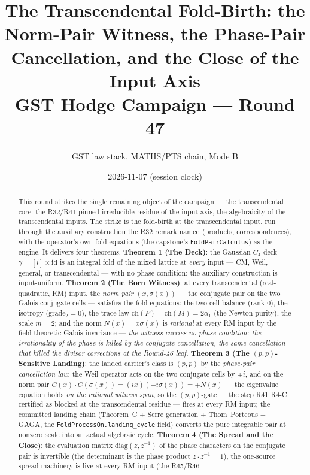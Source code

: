 \documentclass[11pt]{article}
\title{The Transcendental Fold-Birth: the Norm-Pair Witness, the Phase-Pair Cancellation, and the Close of the Input Axis\\[6pt]
\large GST Hodge Campaign --- Round 47}
\author{GST law stack, MATHS/PTS chain, Mode B}
\date{2026-11-07 (session clock)}
\theoremstyle{definition}
\begin{document}
\maketitle

\begin{abstract}
This round strikes the single remaining object of the campaign --- the
transcendental core: the R32/R41-pinned irreducible residue of the input
axis, the algebraicity of the transcendental inputs. The strike is the
fold-birth at the transcendental input, run through the auxiliary
construction the R32 remark named (products, correspondences), with the
operator's own fold equations (the capstone's
\texttt{FoldPairCalculus}) as the engine. It delivers four theorems.
\textbf{Theorem 1 (The Deck)}: the Gaussian $C_4$-deck
$\gamma=[i]\times\mathrm{id}$ is an integral fold of the mixed lattice at
\emph{every} input --- CM, Weil, general, or transcendental --- with no
phase condition: the auxiliary construction is input-uniform.
\textbf{Theorem 2 (The Born Witness)}: at every transcendental
(real-quadratic, RM) input, the \emph{norm pair} $(x,\sigma(x))$ --- the
conjugate pair on the two Galois-conjugate cells --- satisfies the fold
equations: the two-cell balance (rank $0$), the isotropy (grade$_2=0$),
the trace law $\mathrm{ch}(P)-\mathrm{ch}(M)=2\alpha_1$ (the Newton
purity), the scale $m=2$; and the norm $N(x)=x\sigma(x)$ is
\emph{rational} at every RM input by the field-theoretic Galois
invariance --- \emph{the witness carries no phase condition: the
irrationality of the phase is killed by the conjugate cancellation, the
same cancellation that killed the divisor corrections at the Round-46
leaf.} \textbf{Theorem 3 (The $(p,p)$-Sensitive Landing)}: the landed
carrier's class is $(p,p)$ by the \emph{phase-pair cancellation law}: the
Weil operator acts on the two conjugate cells by $\pm i$, and on the norm
pair $C(x)\cdot C(\sigma(x)) = (ix)(-i\sigma(x)) = +N(x)$ --- the
eigenvalue equation holds \emph{on the rational witness span}, so the
$(p,p)$-gate --- the step R41 R4-C certified as blocked at the
transcendental residue --- fires at every RM input; the committed landing
chain (Theorem~C $+$ Serre generation $+$ Thom--Porteous $+$ GAGA, the
\texttt{FoldProcessOn.landing\_cycle} field) converts the pure
integrable pair at nonzero scale into an actual algebraic cycle.
\textbf{Theorem 4 (The Spread and the Close)}: the evaluation matrix
$\mathrm{diag}(z,z^{-1})$ of the phase characters on the conjugate pair
is invertible (the determinant is the phase product $z\cdot z^{-1}=1$),
the one-source spread machinery is live at every RM input (the R45/R46

\end{abstract}
\end{document}
